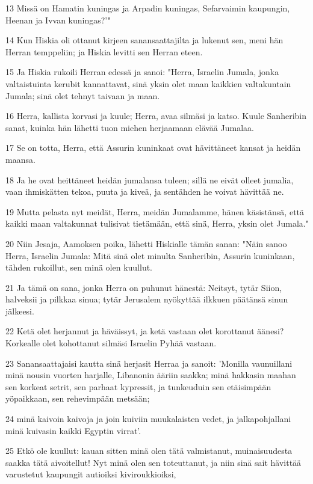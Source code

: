 \par 13 Missä on Hamatin kuningas ja Arpadin kuningas, Sefarvaimin kaupungin, Heenan ja Ivvan kuningas?'"
\par 14 Kun Hiskia oli ottanut kirjeen sanansaattajilta ja lukenut sen, meni hän Herran temppeliin; ja Hiskia levitti sen Herran eteen.
\par 15 Ja Hiskia rukoili Herran edessä ja sanoi: "Herra, Israelin Jumala, jonka valtaistuinta kerubit kannattavat, sinä yksin olet maan kaikkien valtakuntain Jumala; sinä olet tehnyt taivaan ja maan.
\par 16 Herra, kallista korvasi ja kuule; Herra, avaa silmäsi ja katso. Kuule Sanheribin sanat, kuinka hän lähetti tuon miehen herjaamaan elävää Jumalaa.
\par 17 Se on totta, Herra, että Assurin kuninkaat ovat hävittäneet kansat ja heidän maansa.
\par 18 Ja he ovat heittäneet heidän jumalansa tuleen; sillä ne eivät olleet jumalia, vaan ihmiskätten tekoa, puuta ja kiveä, ja sentähden he voivat hävittää ne.
\par 19 Mutta pelasta nyt meidät, Herra, meidän Jumalamme, hänen käsistänsä, että kaikki maan valtakunnat tulisivat tietämään, että sinä, Herra, yksin olet Jumala."
\par 20 Niin Jesaja, Aamoksen poika, lähetti Hiskialle tämän sanan: "Näin sanoo Herra, Israelin Jumala: Mitä sinä olet minulta Sanheribin, Assurin kuninkaan, tähden rukoillut, sen minä olen kuullut.
\par 21 Ja tämä on sana, jonka Herra on puhunut hänestä: Neitsyt, tytär Siion, halveksii ja pilkkaa sinua; tytär Jerusalem nyökyttää ilkkuen päätänsä sinun jälkeesi.
\par 22 Ketä olet herjannut ja häväissyt, ja ketä vastaan olet korottanut äänesi? Korkealle olet kohottanut silmäsi Israelin Pyhää vastaan.
\par 23 Sanansaattajaisi kautta sinä herjasit Herraa ja sanoit: 'Monilla vaunuillani minä nousin vuorten harjalle, Libanonin ääriin saakka; minä hakkasin maahan sen korkeat setrit, sen parhaat kypressit, ja tunkeuduin sen etäisimpään yöpaikkaan, sen rehevimpään metsään;
\par 24 minä kaivoin kaivoja ja join kuiviin muukalaisten vedet, ja jalkapohjallani minä kuivasin kaikki Egyptin virrat'.
\par 25 Etkö ole kuullut: kauan sitten minä olen tätä valmistanut, muinaisuudesta saakka tätä aivoitellut! Nyt minä olen sen toteuttanut, ja niin sinä sait hävittää varustetut kaupungit autioiksi kiviroukkioiksi,
